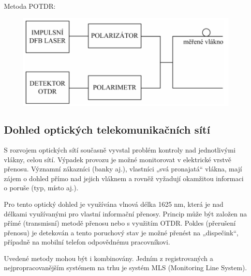 Metoda POTDR:
\begin{figure}[!ht]
\begin{center}
    \includegraphics[scale=1]{obrazky/merPMD3.png}
  \end{center}
\end{figure}

\subsection{Dohled optických telekomunikačních sítí}
S rozvojem optických sítí současně vyvstal problém kontroly nad jednotlivými vlákny, celou sítí. Výpadek provozu je možné monitorovat v elektrické vrstvě přenosu. Významní zákazníci (banky aj.), vlastníci „svá pronajatá“ vlákna, mají zájem o dohled přímo nad jejich vláknem a rovněž vyžadují okamžitou informaci o poruše (typ, místo aj.).

Pro tento optický dohled je využívána vlnová délka 1625 nm, která je nad délkami využívanými pro vlastní informační přenosy. Princip může být založen na přímé (transmisní) metodě přenosu nebo s využitím OTDR. Pokles (přerušení přenosu) je detekován a tento poruchový stav je možné přenést na „dispečink“, případně na mobilní telefon odpovědnému pracovníkovi.

Uvedené metody mohou být i kombinovány. Jedním z registrovaných a nejpropracovanějším systémem na trhu je systém MLS (Monitoring Line System).
